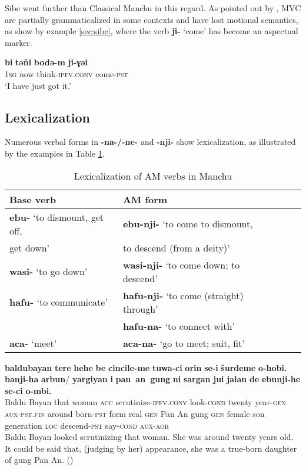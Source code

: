 \documentclass{article}
\newcommand{\ipa}[1]{\textbf{{\phon\mbox{#1}}}} %
\begin{document}
Sibe went further than Classical Manchu in this regard. As pointed out by \citet[156]{zikmundova13sibe}, MVC are partially grammaticalized in some contexts and have lost motional semantics, as show by example \ref{sec:sibe}, where the verb \ipa{ji-} `come' has become an aspectual marker.

\begin{exe}
\ex \label{sec:sibe}
\gll
\ipa{bi} 	\ipa{tǝňi} 	\ipa{bodǝ-m} 	\ipa{ji-ɣǝi} \\
\textsc{1sg} now think-\textsc{ipfv.conv} come-\textsc{pst} \\
\glt ‘I have just got it.'
\end{exe}


\subsection{Lexicalization} \label{sec:lexicalization}
Numerous verbal forms in \ipa{-na-/-ne-} and \ipa{-nji-} show lexicalization, as illustrated by the examples in Table \ref{tab:lexicalization}.

\begin{table}[h]
\caption{Lexicalization of AM verbs in Manchu} \label{tab:lexicalization} \centering
\begin{tabular}{lllll}
\toprule
Base verb & AM form  \\
\midrule
\ipa{ebu-} ‘to dismount, get off,  & \ipa{ebu-nji-} ‘to come to dismount, \\
get down’& to descend (from a deity)’\\
 \ipa{wasi-} ‘to go down’ & \ipa{wasi-nji-} ‘to come down; to descend’\\
 \ipa{hafu-} ‘to communicate’ & \ipa{hafu-nji-} ‘to come (straight) through’ \\
 & \ipa{hafu-na-} ‘to connect with’\\
 \ipa{aca-} `meet' &  \ipa{aca-na-} `go to meet; suit, fit' \\
 \bottomrule
\end{tabular}
\end{table}



\begin{exe}
\ex 
\gll \ipa{baldubayan} 	\ipa{tere} 	\ipa{hehe} 	\ipa{be} 	\ipa{cincile-me} 	\ipa{tuwa-ci} 	\ipa{orin} 	\ipa{se-i} 	\ipa{šurdeme} 	\ipa{o-hobi.} 	\ipa{banji-ha} 	\ipa{arbun}/ 	\ipa{yargiyan} 	\ipa{i} 	\ipa{pan an gung} 	\ipa{ni} 	\ipa{sargan} 	\ipa{jui} 	\ipa{jalan} 	\ipa{de} 	\ipa{ebunji-he} 	\ipa{se-ci} 	\ipa{o-mbi.} \\
{Baldu Bayan} that woman \textsc{acc} scrutinize-\textsc{ipfv.conv} look-\textsc{cond} twenty year-\textsc{gen} \textsc{aux-pst.fin} around born-\textsc{pst} form real \textsc{gen} {Pan An gung} \textsc{gen} female son generation \textsc{loc} descend-\textsc{pst} say-\textsc{cond} \textsc{aux-aor} \\
\glt Baldu Bayan looked scrutinizing that woman. She was around twenty years old. It could be said that, (judging by her) appearance, she was a true-born daughter of gung Pan An. (\citealt[71,6a-6b/100]{jaxontov93nisan})
\end{exe}
\end{document}
